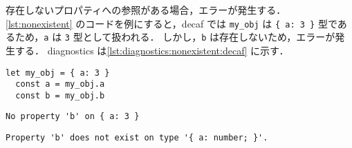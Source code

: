 存在しないプロパティへの参照がある場合，エラーが発生する．
\ref{lst:nonexistent} のコードを例にすると，decaf では \texttt{my\_obj} は \texttt{\{ a: 3 \}} 型であるため，\texttt{a} は \texttt{3} 型として扱われる．
しかし，\texttt{b} は存在しないため，エラーが発生する．
diagnostics は\ref{lst:diagnostics:nonexistent:decaf} に示す．

\begin{lstlisting}[caption=存在しないプロパティの例, label=lst:nonexistent]
  let my_obj = { a: 3 }
  const a = my_obj.a
  const b = my_obj.b
\end{lstlisting}

\begin{minipage}{0.45\textwidth}
    \begin{lstlisting}[caption=decaf の diagnostics, label=lst:diagnostics:nonexistent:decaf]
    No property 'b' on { a: 3 }
  \end{lstlisting}
\end{minipage}
\hfill
\begin{minipage}{0.45\textwidth}
    \begin{lstlisting}[caption=tsc の diagnostics, label=lst:diagnostics:nonexistent:tsc]
    Property 'b' does not exist on type '{ a: number; }'.
  \end{lstlisting}
\end{minipage}
